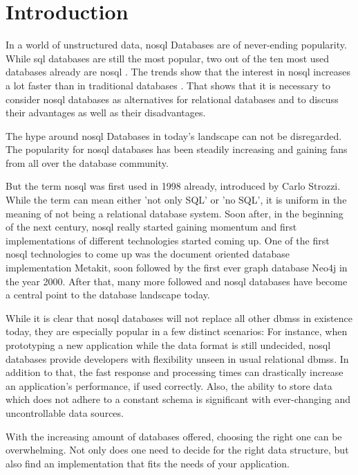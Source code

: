 \chapter{Introduction}

In a world of unstructured data, \gls{nosql} Databases are of never-ending
popularity.  While \acrshort{sql} databases are still the most popular, two out
of the ten most used databases already are \gls{nosql}
\parencite{dbenginesRanking}.  The trends show that the interest in \gls{nosql}
increases a lot faster than in traditional databases \parencite[section
\texttt{ranking\_categories}]{dbenginesRanking}. That shows that it is
necessary to consider \gls{nosql} databases as alternatives for relational
databases and to discuss their advantages as well as their disadvantages.

The hype around \gls{nosql} Databases in today's landscape can not be
disregarded.  The popularity for \gls{nosql} databases has been steadily
increasing and gaining fans from all over the database community.

But the term \gls{nosql} was first used in 1998 already, introduced by Carlo
Strozzi. While the term can mean either 'not only SQL' or 'no SQL', it is
uniform in the meaning of not being a relational database system. Soon after,
in the beginning of the next century, \gls{nosql} really started gaining
momentum and first implementations of different technologies started coming up.
One of the first \gls{nosql} technologies to come up was the document oriented
database implementation Metakit, soon followed by the first ever graph database
Neo4j in the year 2000. After that, many more followed and \gls{nosql}
databases have become a central point to the database landscape today. 

While it is clear that \gls{nosql} databases will not replace all other
\glspl{dbms} in existence today, they are especially popular in a few distinct
scenarios: For instance, when prototyping a new application while the data
format is still undecided, \gls{nosql} databases provide developers with
flexibility unseen in usual relational \glspl{dbms}. In addition to that, the
fast response and processing times can drastically increase an application's
performance, if used correctly. Also, the ability to store data which does not
adhere to a constant schema is significant with ever-changing and
uncontrollable data sources.

With the increasing amount of databases offered, choosing the right one can be
overwhelming. Not only does one need to decide for the right data structure,
but also find an implementation that fits the needs of your application.

